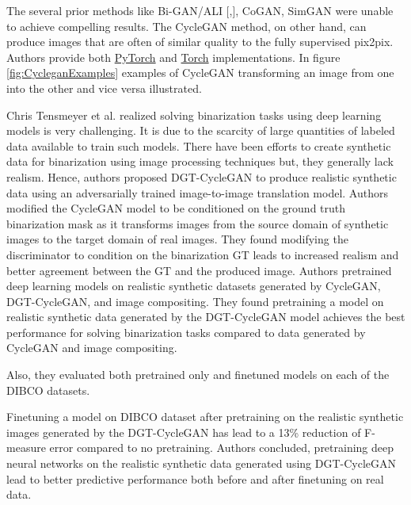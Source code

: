 The several prior methods like Bi-GAN/ALI [\cite{donahue2017adversarial},\cite{dumoulin2017adversarially}], CoGAN\cite{liu2016coupled}, SimGAN\cite{shrivastava2017learning} were unable to achieve compelling results. The \ac{CycleGAN} method, on other hand, can produce images that are often of similar quality to the fully supervised pix2pix\cite{isola2018imagetoimage}. Authors provide both \href{https://github.com/junyanz/pytorch-CycleGAN-and-pix2pix}{PyTorch} and \href{https://github.com/junyanz/CycleGAN}{Torch} implementations. In figure \ref{fig:CycleganExamples} examples of \ac{CycleGAN} transforming an image from one into the other and vice versa illustrated.


Chris Tensmeyer et al.\cite{8978087} realized solving binarization tasks using deep learning models is very challenging. It is due to the scarcity of large quantities of labeled data available to train such models. There have been efforts to create synthetic data for binarization using image processing techniques but, they generally lack realism\cite{8978087}. Hence, authors proposed DGT-CycleGAN to produce realistic synthetic data using an adversarially trained image-to-image translation model\cite{8978087}. Authors modified the \ac{CycleGAN} model to be conditioned on the ground truth binarization mask as it transforms images from the source domain of synthetic images to the target domain of real images\cite{8978087}. They found modifying the discriminator to condition on the binarization \ac{GT} leads to increased realism and better agreement between the \ac{GT} and the produced image\cite{8978087}.  Authors pretrained deep learning models on realistic synthetic datasets generated by \ac{CycleGAN}, DGT-CycleGAN, and image compositing\cite{8978087}. They found pretraining a model on realistic synthetic data generated by the DGT-CycleGAN model achieves the best performance for solving binarization tasks compared to data generated by \ac{CycleGAN} and image compositing\cite{8978087}.


Also, they evaluated both pretrained only and finetuned models on each of the \ac{DIBCO} datasets\footnotemark. 

Finetuning a model on \ac{DIBCO} dataset after pretraining on the realistic synthetic images generated by the DGT-CycleGAN has lead to a 13\% reduction of F-measure error compared to no pretraining. Authors concluded, pretraining deep neural networks on the realistic synthetic data generated using DGT-CycleGAN lead to better predictive performance both before and after finetuning on real data.


